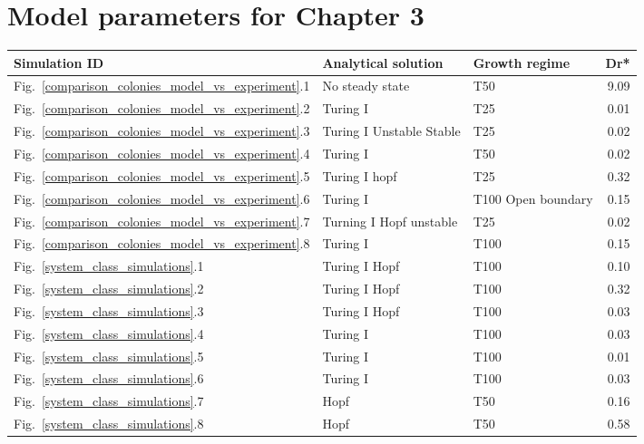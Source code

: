 \chapter{Model parameters for Chapter 3}
\begin{table}
    \centering
    \begin{adjustbox}{center}
        \begin{tabular}{lllr}
            \toprule
            \textbf{Simulation ID} & \textbf{Analytical solution} & \textbf{Growth regime} & \textbf{Dr*} \\
            \midrule
             Fig.~\ref{comparison_colonies_model_vs_experiment}.1 & No steady state & T50 & 9.09 \\
             Fig.~\ref{comparison_colonies_model_vs_experiment}.2 & Turing I & T25 & 0.01 \\
             Fig.~\ref{comparison_colonies_model_vs_experiment}.3 & Turing I Unstable Stable & T25 & 0.02 \\
             Fig.~\ref{comparison_colonies_model_vs_experiment}.4 & Turing I & T50 & 0.02 \\
             Fig.~\ref{comparison_colonies_model_vs_experiment}.5 & Turing I hopf & T25 & 0.32 \\
             Fig.~\ref{comparison_colonies_model_vs_experiment}.6 & Turing I & T100 Open boundary & 0.15 \\
             Fig.~\ref{comparison_colonies_model_vs_experiment}.7 & Turning I Hopf unstable & T25 & 0.02 \\
             Fig.~\ref{comparison_colonies_model_vs_experiment}.8 & Turing I & T100 & 0.15 \\
             Fig.~\ref{system_class_simulations}.1 & Turing I Hopf & T100 & 0.10 \\
             Fig.~\ref{system_class_simulations}.2 & Turing I Hopf & T100 & 0.32 \\
             Fig.~\ref{system_class_simulations}.3 & Turing I Hopf & T100 & 0.03 \\
             Fig.~\ref{system_class_simulations}.4 & Turing I & T100 & 0.03 \\
             Fig.~\ref{system_class_simulations}.5 & Turing I & T100 & 0.01 \\
             Fig.~\ref{system_class_simulations}.6 & Turing I & T100 & 0.03 \\
             Fig.~\ref{system_class_simulations}.7 & Hopf & T50 & 0.16 \\
             Fig.~\ref{system_class_simulations}.8 & Hopf & T50 & 0.58 \\

\end{tabular}
\end{adjustbox}
\end{table}
